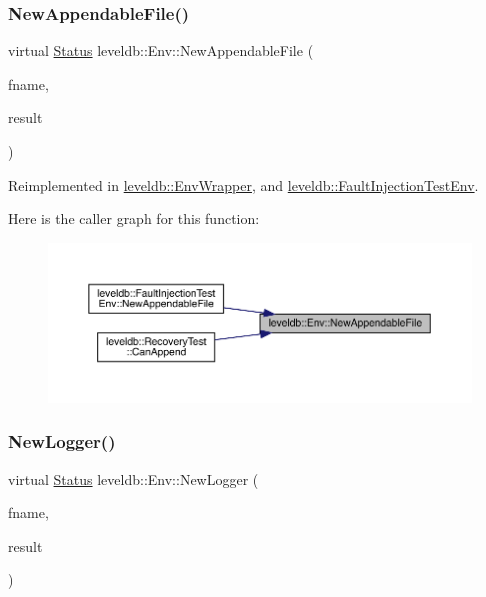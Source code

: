 \subsubsection{\texorpdfstring{NewAppendableFile()}{NewAppendableFile()}}
{\footnotesize\ttfamily virtual \mbox{\hyperlink{classleveldb_1_1_status}{Status}} leveldb\+::\+Env\+::\+New\+Appendable\+File (\begin{DoxyParamCaption}\item[{const std\+::string \&}]{fname,  }\item[{\mbox{\hyperlink{classleveldb_1_1_writable_file}{Writable\+File}} $\ast$$\ast$}]{result }\end{DoxyParamCaption})\hspace{0.3cm}{\ttfamily [virtual]}}



Reimplemented in \mbox{\hyperlink{classleveldb_1_1_env_wrapper_a8fc08d24c02191608af21473504ea15e}{leveldb\+::\+Env\+Wrapper}}, and \mbox{\hyperlink{classleveldb_1_1_fault_injection_test_env_ab3147789bfa49d4a50a06e7c2a1628ef}{leveldb\+::\+Fault\+Injection\+Test\+Env}}.

Here is the caller graph for this function\+:
\nopagebreak
\begin{figure}[H]
\begin{center}
\leavevmode
\includegraphics[width=350pt]{classleveldb_1_1_env_a77886b6f8f8b5df8e40057be234a3b5d_icgraph}
\end{center}
\end{figure}
\mbox{\label{classleveldb_1_1_env_a53a4c41d294fe619f13ec5b697ffc933}} 
\subsubsection{\texorpdfstring{NewLogger()}{NewLogger()}}
{\footnotesize\ttfamily virtual \mbox{\hyperlink{classleveldb_1_1_status}{Status}} leveldb\+::\+Env\+::\+New\+Logger (\begin{DoxyParamCaption}\item[{const std\+::string \&}]{fname,  }\item[{\mbox{\hyperlink{classleveldb_1_1_logger}{Logger}} $\ast$$\ast$}]{result }\end{DoxyParamCaption})\hspace{0.3cm}{\ttfamily [pure virtual]}}



